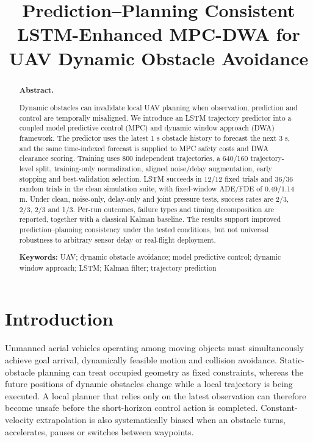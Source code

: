 \documentclass[10pt,a4paper]{article}
\title{Prediction--Planning Consistent LSTM-Enhanced MPC-DWA for UAV Dynamic Obstacle Avoidance}
\author{}
\date{}
\begin{document}
\maketitle
\begin{abstract}
\noindent\textbf{Abstract. }

Dynamic obstacles can invalidate local UAV planning when observation, prediction and control are temporally misaligned. We introduce an LSTM trajectory predictor into a coupled model predictive control (MPC) and dynamic window approach (DWA) framework. The predictor uses the latest 1 s obstacle history to forecast the next 3 s, and the same time-indexed forecast is supplied to MPC safety costs and DWA clearance scoring. Training uses 800 independent trajectories, a 640/160 trajectory-level split, training-only normalization, aligned noise/delay augmentation, early stopping and best-validation selection. LSTM succeeds in 12/12 fixed trials and 36/36 random trials in the clean simulation suite, with fixed-window ADE/FDE of 0.49/1.14 m. Under clean, noise-only, delay-only and joint pressure tests, success rates are 2/3, 2/3, 2/3 and 1/3. Per-run outcomes, failure types and timing decomposition are reported, together with a classical Kalman baseline. The results support improved prediction–planning consistency under the tested conditions, but not universal robustness to arbitrary sensor delay or real-flight deployment.

\textbf{Keywords:} UAV; dynamic obstacle avoidance; model predictive control; dynamic window approach; LSTM; Kalman filter; trajectory prediction

\end{abstract}

\section{Introduction}

Unmanned aerial vehicles operating among moving objects must simultaneously achieve goal arrival, dynamically feasible motion and collision avoidance. Static-obstacle planning can treat occupied geometry as fixed constraints, whereas the future positions of dynamic obstacles change while a local trajectory is being executed. A local planner that relies only on the latest observation can therefore become unsafe before the short-horizon control action is completed. Constant-velocity extrapolation is also systematically biased when an obstacle turns, accelerates, pauses or switches between waypoints.
\end{document}

